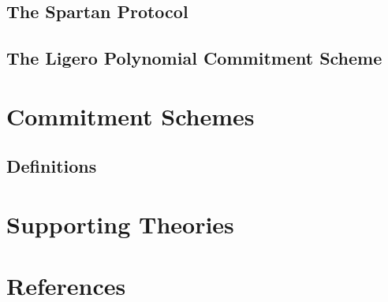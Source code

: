 \section{The Spartan Protocol}

\section{The Ligero Polynomial Commitment Scheme}

\chapter{Commitment Schemes}\label{chap:commitment_schemes}

\section{Definitions}





\chapter{Supporting Theories}\label{chap:supporting_theories}







\chapter{References}\label{chap:references}
